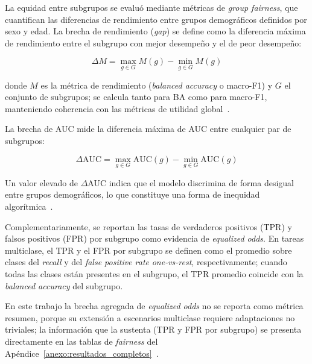 La equidad entre subgrupos se evaluó mediante métricas de \textit{group fairness}, que cuantifican las diferencias de rendimiento entre grupos demográficos definidos por sexo y edad. La brecha de rendimiento (\textit{gap}) se define como la diferencia máxima de rendimiento entre el subgrupo con mejor desempeño y el de peor desempeño:

\begin{equation}
    \Delta M = \max_{g \in G} M(g) - \min_{g \in G} M(g)
    \label{eq:gap}
\end{equation}

donde $M$ es la métrica de rendimiento (\textit{balanced accuracy} o macro-F1) y $G$ el conjunto de subgrupos; se calcula tanto para BA como para macro-F1, manteniendo coherencia con las métricas de utilidad global~\parencite{huang2025flex}. 

La brecha de AUC mide la diferencia máxima de AUC entre cualquier par de subgrupos:

\begin{equation}
    \Delta\text{AUC} = \max_{g \in G} \text{AUC}(g) - \min_{g \in G} \text{AUC}(g)
    \label{eq:delta_auc}
\end{equation}

Un valor elevado de $\Delta$AUC indica que el modelo discrimina de forma desigual entre grupos demográficos, lo que constituye una forma de inequidad algorítmica~\parencite{obermeyer2019dissecting}. 

Complementariamente, se reportan las tasas de verdaderos positivos (TPR) y falsos positivos (FPR) por subgrupo como evidencia de \textit{equalized odds}. En tareas multiclase, el TPR y el FPR por subgrupo se definen como el promedio sobre clases del \textit{recall} y del \textit{false positive rate} \textit{one-vs-rest}, respectivamente; cuando todas las clases están presentes en el subgrupo, el TPR promedio coincide con la \textit{balanced accuracy} del subgrupo. 

En este trabajo la brecha agregada de \textit{equalized odds} no se reporta como métrica resumen, porque su extensión a escenarios multiclase requiere adaptaciones no triviales; la información que la sustenta (TPR y FPR por subgrupo) se presenta directamente en las tablas de \textit{fairness} del Apéndice~\ref{anexo:resultados_completos}~\parencite{matos2025critical}.

